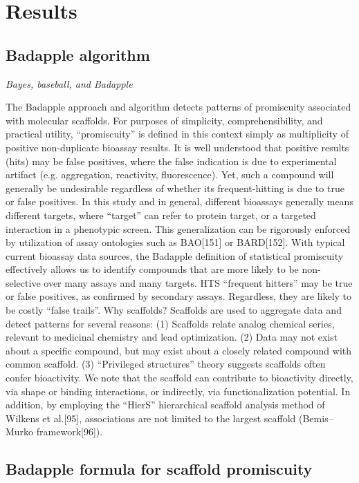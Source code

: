 \section{Results}

\subsection{Badapple algorithm}

\emph{Bayes, baseball, and Badapple}

The Badapple approach and algorithm detects patterns of promiscuity associated with molecular scaffolds. For purposes of simplicity, comprehensibility, and practical utility, “promiscuity” is defined in this context simply as multiplicity of positive non-duplicate bioassay results. It is well understood that positive results (hits) may be false positives, where the false indication is due to experimental artifact (e.g. aggregation, reactivity, fluorescence). Yet, such a compound will generally be undesirable regardless of whether its frequent-hitting is due to true or false positives. In this study and in general, different bioassays generally means different targets, where “target” can refer to protein target, or a targeted interaction in a phenotypic screen. This generalization can be rigorously enforced by utilization of assay ontologies such as BAO[151] or BARD[152]. With typical current bioassay data sources, the Badapple definition of statistical promiscuity effectively allows us to identify compounds that are more likely to be non-selective over many assays and many targets. HTS “frequent hitters” may be true or false positives, as confirmed by secondary assays. Regardless, they are likely to be costly “false trails”.
Why scaffolds?
Scaffolds are used to aggregate data and detect patterns for several reasons: (1) Scaffolds relate analog chemical series, relevant to medicinal chemistry and lead optimization. (2) Data may not exist about a specific compound, but may exist about a closely related compound with common scaffold. (3) “Privileged structures” theory suggests scaffolds often confer bioactivity. We note that the scaffold can contribute to bioactivity directly, via shape or binding interactions, or indirectly, via functionalization potential. In addition, by employing the “HierS” hierarchical scaffold analysis method of Wilkens et al.[95], associations are not limited to the largest scaffold (Bemis–Murko framework[96]).

\subsection{Badapple formula for scaffold promiscuity}

